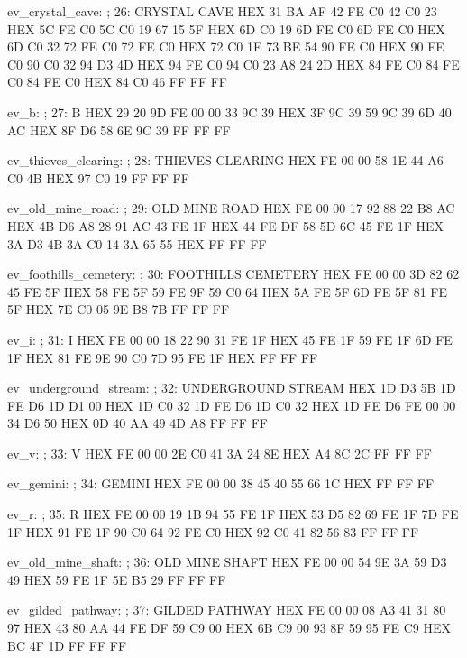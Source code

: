 \documentclass[10pt]{report}
\begin{document}
ev_crystal_cave:                        ; 26: CRYSTAL CAVE
    HEX 31 BA AF 42 FE C0 42 C0 23
    HEX 5C FE C0 5C C0 19 67 15 5F
    HEX 6D C0 19 6D FE C0 6D FE C0
    HEX 6D C0 32 72 FE C0 72 FE C0
    HEX 72 C0 1E 73 BE 54 90 FE C0
    HEX 90 FE C0 90 C0 32 94 D3 4D
    HEX 94 FE C0 94 C0 23 A8 24 2D
    HEX 84 FE C0 84 FE C0 84 FE C0
    HEX 84 C0 46 FF FF FF

ev_b:                                   ; 27: B
    HEX 29 20 9D FE 00 00 33 9C 39
    HEX 3F 9C 39 59 9C 39 6D 40 AC
    HEX 8F D6 58 6E 9C 39 FF FF FF

ev_thieves_clearing:                    ; 28: THIEVES CLEARING
    HEX FE 00 00 58 1E 44 A6 C0 4B
    HEX 97 C0 19 FF FF FF

ev_old_mine_road:                       ; 29: OLD MINE ROAD
    HEX FE 00 00 17 92 88 22 B8 AC
    HEX 4B D6 A8 28 91 AC 43 FE 1F
    HEX 44 FE DF 58 5D 6C 45 FE 1F
    HEX 3A D3 4B 3A C0 14 3A 65 55
    HEX FF FF FF

ev_foothills_cemetery:                  ; 30: FOOTHILLS CEMETERY
    HEX FE 00 00 3D 82 62 45 FE 5F
    HEX 58 FE 5F 59 FE 9F 59 C0 64
    HEX 5A FE 5F 6D FE 5F 81 FE 5F
    HEX 7E C0 05 9E B8 7B FF FF FF

ev_i:                                   ; 31: I
    HEX FE 00 00 18 22 90 31 FE 1F
    HEX 45 FE 1F 59 FE 1F 6D FE 1F
    HEX 81 FE 9E 90 C0 7D 95 FE 1F
    HEX FF FF FF

ev_underground_stream:                  ; 32: UNDERGROUND STREAM
    HEX 1D D3 5B 1D FE D6 1D D1 00
    HEX 1D C0 32 1D FE D6 1D C0 32
    HEX 1D FE D6 FE 00 00 34 D6 50
    HEX 0D 40 AA 49 4D A8 FF FF FF

ev_v:                                   ; 33: V
    HEX FE 00 00 2E C0 41 3A 24 8E
    HEX A4 8C 2C FF FF FF

ev_gemini:                              ; 34: GEMINI
    HEX FE 00 00 38 45 40 55 66 1C
    HEX FF FF FF

ev_r:                                   ; 35: R
    HEX FE 00 00 19 1B 94 55 FE 1F
    HEX 53 D5 82 69 FE 1F 7D FE 1F
    HEX 91 FE 1F 90 C0 64 92 FE C0
    HEX 92 C0 41 82 56 83 FF FF FF

ev_old_mine_shaft:                      ; 36: OLD MINE SHAFT
    HEX FE 00 00 54 9E 3A 59 D3 49
    HEX 59 FE 1F 5E B5 29 FF FF FF

ev_gilded_pathway:                      ; 37: GILDED PATHWAY
    HEX FE 00 00 08 A3 41 31 80 97
    HEX 43 80 AA 44 FE DF 59 C9 00
    HEX 6B C9 00 93 8F 59 95 FE C9
    HEX BC 4F 1D FF FF FF
\end{document}
